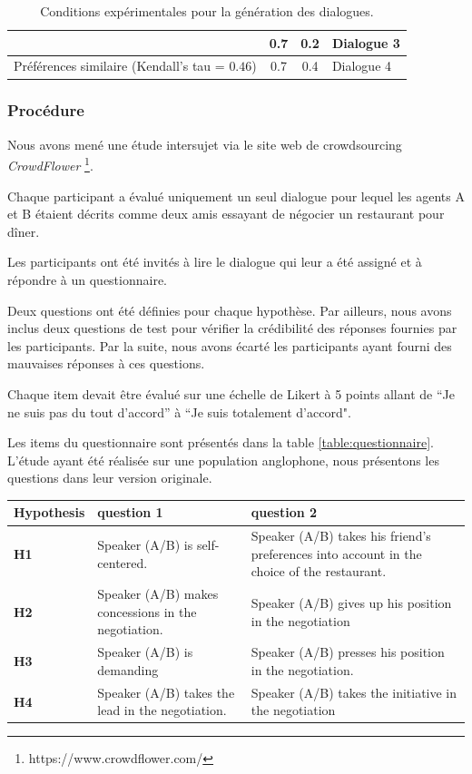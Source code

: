 {\begin{table}[h]
\begin{tabular}{ |l|c|c|l| }
						\newline   &0.7 & 0.2 & Dialogue 3\\ 
						\hline
						\newline Préférences similaire (Kendall's tau = $0.46$) & 0.7 & 0.4 & Dialogue 4\\
						\hline
					\end{tabular}
					\caption{Conditions expérimentales pour la génération des dialogues.} 
					\label{table:conditions}
				\end{table}
		
			\subsubsection{Procédure}
					\label{sec:questionnaire}
				Nous avons mené une étude intersujet via le site web de crowdsourcing  \emph {CrowdFlower} \footnote {https://www.crowdflower.com/}.
				
				Chaque participant a évalué uniquement un seul dialogue pour lequel les agents A et B étaient décrits comme deux amis essayant de négocier un restaurant pour dîner.
				
				Les participants ont été invités à lire le dialogue qui leur a été assigné et à répondre à un questionnaire.
				
				Deux questions ont été définies pour chaque hypothèse. Par ailleurs, nous avons inclus deux questions de test pour vérifier la crédibilité des réponses fournies par les participants. Par la suite, nous avons écarté les participants ayant fourni des mauvaises réponses à ces questions. 
				
				Chaque item devait être évalué sur une échelle de Likert à 5 points allant de ``Je ne suis pas du tout d'accord'' à ``Je suis totalement d'accord".
				
				Les items du questionnaire sont présentés dans la table \ref{table:questionnaire}. L'étude ayant été réalisée sur une population anglophone, nous présentons les questions dans leur version originale. 
				
				
								\begin{table}[h]
																\centering
								\begin{tabular}{|p{1.75cm}|p{4cm}|p{4.8cm}|}

									\hline
									Hypothesis &question 1& question 2 \\
									\hline
									\textbf{H1} &Speaker (A/B) is self-centered. &Speaker (A/B) takes his friend's preferences into account in the choice of the restaurant.\\
									\hline
									\textbf{H2} &Speaker (A/B) makes concessions in the negotiation.&Speaker (A/B) gives up his position in the negotiation\\
									\hline
									\textbf{H3} & Speaker (A/B) is demanding&Speaker (A/B) presses his position in the negotiation. \\
									\hline
									\textbf{H4} &Speaker (A/B) takes the lead in the negotiation.&Speaker (A/B) takes the initiative in the negotiation \\
									\hline
								\end{tabular}
							

\end{table}}
